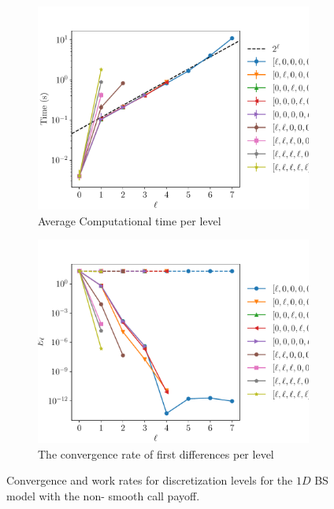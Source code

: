 \documentclass[11pt]{article}
\begin{document}
\begin{figure}[!h]
	\centering
	\begin{subfigure}{.5\textwidth}
		\centering
		\includegraphics[width=0.95\linewidth]{./figures/1D_BS_8_steps_non_smooth/level_work.pdf}
		\caption{Average Computational time per level}
		\label{fig:misc_1D_BS_non_smooth_8steps_sub3}
	\end{subfigure}%
	\begin{subfigure}{.5\textwidth}
		\centering
		\includegraphics[width=0.95\linewidth]{./figures/1D_BS_8_steps_non_smooth/levels_error_rate.pdf}
		\caption{ The convergence rate of first differences per level}
		\label{fig:misc_1D_BS_non_smooth_8steps_sub4}
	\end{subfigure}%
	\caption{Convergence and work rates for discretization levels for the $1D$ BS model with the non- smooth call payoff.}
	\label{fig:misc_1D_BS_8teps_2}
\end{figure}
\end{document}
